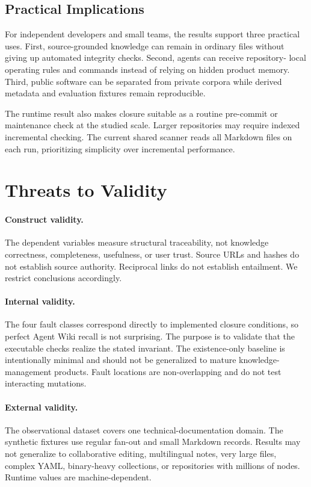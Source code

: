 \documentclass[preprint,12pt,a4paper]{elsarticle}
\begin{document}
\subsection{Practical Implications}

For independent developers and small teams, the results support three practical
uses. First, source-grounded knowledge can remain in ordinary files without
giving up automated integrity checks. Second, agents can receive repository-
local operating rules and commands instead of relying on hidden product memory.
Third, public software can be separated from private corpora while derived
metadata and evaluation fixtures remain reproducible.

The runtime result also makes closure suitable as a routine pre-commit or
maintenance check at the studied scale. Larger repositories may require indexed
incremental checking. The current shared scanner reads all Markdown files on
each run, prioritizing simplicity over incremental performance.

\section{Threats to Validity}

\paragraph{Construct validity.}
The dependent variables measure structural traceability, not knowledge
correctness, completeness, usefulness, or user trust. Source URLs and hashes do
not establish source authority. Reciprocal links do not establish entailment.
We restrict conclusions accordingly.

\paragraph{Internal validity.}
The four fault classes correspond directly to implemented closure conditions,
so perfect Agent Wiki recall is not surprising. The purpose is to validate that
the executable checks realize the stated invariant. The existence-only
baseline is intentionally minimal and should not be generalized to mature
knowledge-management products. Fault locations are non-overlapping and do not
test interacting mutations.

\paragraph{External validity.}
The observational dataset covers one technical-documentation domain. The
synthetic fixtures use regular fan-out and small Markdown records. Results may
not generalize to collaborative editing, multilingual notes, very large files,
complex YAML, binary-heavy collections, or repositories with millions of
nodes. Runtime values are machine-dependent.
\end{document}
